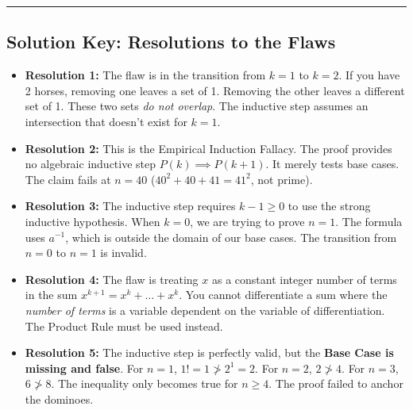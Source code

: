 \documentclass[11pt, a4paper]{article}
\theoremstyle{definition}
\theoremstyle{remark}
\begin{document}
\vspace{2em}
\hrule
\vspace{1em}
\subsection*{Solution Key: Resolutions to the Flaws}
\begin{itemize}
    \item \textbf{Resolution 1:} The flaw is in the transition from $k=1$ to $k=2$. If you have 2 horses, removing one leaves a set of 1. Removing the other leaves a different set of 1. These two sets \textit{do not overlap}. The inductive step assumes an intersection that doesn't exist for $k=1$.
    \item \textbf{Resolution 2:} This is the Empirical Induction Fallacy. The proof provides no algebraic inductive step $P(k) \implies P(k+1)$. It merely tests base cases. The claim fails at $n=40$ ($40^2+40+41 = 41^2$, not prime).
    \item \textbf{Resolution 3:} The inductive step requires $k-1 \ge 0$ to use the strong inductive hypothesis. When $k=0$, we are trying to prove $n=1$. The formula uses $a^{-1}$, which is outside the domain of our base cases. The transition from $n=0$ to $n=1$ is invalid.
    \item \textbf{Resolution 4:} The flaw is treating $x$ as a constant integer number of terms in the sum $x^{k+1} = x^k + \dots + x^k$. You cannot differentiate a sum where the \textit{number of terms} is a variable dependent on the variable of differentiation. The Product Rule must be used instead.
    \item \textbf{Resolution 5:} The inductive step is perfectly valid, but the \textbf{Base Case is missing and false}. For $n=1$, $1! = 1 \ngtr 2^1 = 2$. For $n=2$, $2 \ngtr 4$. For $n=3$, $6 \ngtr 8$. The inequality only becomes true for $n \ge 4$. The proof failed to anchor the dominoes.
\end{itemize}
\end{document}

